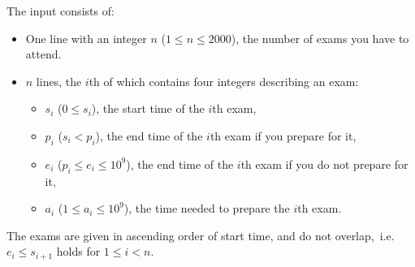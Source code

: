 
    The input consists of:
    \begin{itemize}
        \item One line with an integer $n$ ($1 \leq n\leq 2000$), the number of exams you have to attend.
		\item $n$ lines, the $i$th of which contains four integers describing an exam:
		\begin{itemize}
			\item $s_i$ ($0 \leq s_i$), the start time of the $i$th exam,
			\item $p_i$ ($s_i < p_i$), the end time of the $i$th exam if you prepare for it,
			\item $e_i$ ($p_i \leq e_i \leq 10^9$), the end time of the $i$th exam if you do not prepare for it,
			\item $a_i$ ($1 \leq a_i \leq 10^9$), the time needed to prepare the $i$th exam.
		\end{itemize}
    \end{itemize}
	The exams are given in ascending order of start time, and do not overlap,~i.e.~$e_i \leq s_{i+1}$ holds for $1 \leq i < n$.
